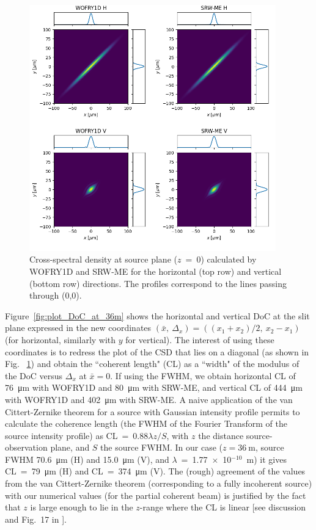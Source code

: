 \documentclass{iucr}              %
\begin{document}
\begin{figure}
    \label{fig:plot_CSD_at_source}
    \includegraphics[width=0.95\textwidth]{figures/plot_CSD_at_source.png}
    \caption{Cross-spectral density at source plane ($z$~=~0) calculated by WOFRY1D and SRW-ME for the horizontal (top row) and vertical (bottom row) directions.
    The profiles correspond to the lines passing through (0,0).
    }
\end{figure}

Figure~\ref{fig:plot_DoC_at_36m} shows the horizontal and vertical DoC at the slit plane expressed in the new coordinates $(\bar{x},~\Delta_x) = ((x_1+x_2)\big/2,~x_2-x_1)$ (for horizontal, similarly with $y$ for vertical). The interest of using these coordinates is to redress the plot of the CSD that lies on a diagonal (as shown in Fig. ~\ref{fig:plot_CSD_at_source}) and obtain the ``coherent length" (CL) as a ``width" of the modulus of the DoC versus $\Delta_x$ at $\bar{x}=0$. If using the FWHM, we obtain horizontal CL of \SI{76}{\micro\meter} with WOFRY1D and \SI{80}{\micro\meter} with SRW-ME, and vertical CL of
\SI{444}{\micro\meter} with WOFRY1D and \SI{402}{\micro\meter} with SRW-ME. A naive application of the van Cittert-Zernike theorem for a source with Gaussian intensity profile permits to calculate the coherence length (the FWHM of the Fourier Transform of the source intensity profile) as CL~=~0.88$\lambda z/S$, with $z$ the distance source-observation plane, and $S$ the source FWHM. In our case ($z=\SI{36}{\meter}$, source FWHM \SI{70.6}{\micro\meter} (H) and \SI{15.0}{\micro\meter} (V), and $\lambda$~=~1.77~$\times$~10$^{-10}$~m) it gives CL~=~\SI{79}{\micro\meter} (H) and CL~=~\SI{374}{\micro\meter} (V). The (rough) agreement of the values from the van Cittert-Zernike theorem (corresponding to a fully incoherent source) with our numerical values (for the partial coherent beam) is justified by the fact that $z$ is large enough to lie in the $z$-range where the CL is linear [see discussion and Fig.~17 in \cite{geloni2008}].
\end{document}
